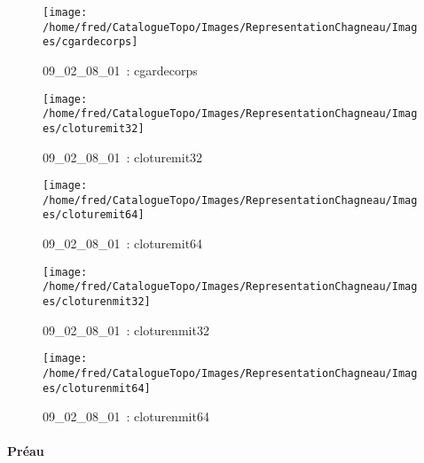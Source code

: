 \documentclass[12pt,titlepage]{book}
\begin{document}
\begin{figure}[h!]
  \begin{minipage}[t]{3cm}
    \begin{center}
      \texttt{[image: /home/fred/CatalogueTopo/Images/RepresentationChagneau/Images/cgardecorps]}
      \caption[~09\_02\_08\_01]{\small{09\_02\_08\_01~:} \tiny{cgardecorps}}\label{cgardecorps}
    \end{center}
  \end{minipage}
  \begin{minipage}[t]{3cm}
    \begin{center}
      \texttt{[image: /home/fred/CatalogueTopo/Images/RepresentationChagneau/Images/cloturemit32]}
      \caption[~09\_02\_08\_01]{\small{09\_02\_08\_01~:} \tiny{cloturemit32}}\label{cloturemit32}
    \end{center}
  \end{minipage}
  \begin{minipage}[t]{3cm}
    \begin{center}
      \texttt{[image: /home/fred/CatalogueTopo/Images/RepresentationChagneau/Images/cloturemit64]}
      \caption[~09\_02\_08\_01]{\small{09\_02\_08\_01~:} \tiny{cloturemit64}}\label{cloturemit64}
    \end{center}
  \end{minipage}
  \begin{minipage}[t]{3cm}
    \begin{center}
      \texttt{[image: /home/fred/CatalogueTopo/Images/RepresentationChagneau/Images/cloturenmit32]}
      \caption[~09\_02\_08\_01]{\small{09\_02\_08\_01~:} \tiny{cloturenmit32}}\label{cloturenmit32}
    \end{center}
  \end{minipage}
  \begin{minipage}[t]{3cm}
    \begin{center}
      \texttt{[image: /home/fred/CatalogueTopo/Images/RepresentationChagneau/Images/cloturenmit64]}
      \caption[~09\_02\_08\_01]{\small{09\_02\_08\_01~:} \tiny{cloturenmit64}}\label{cloturenmit64}
    \end{center}
  \end{minipage}
\end{figure}


\paragraph{Préau}
\noindent
\vspace{\baselineskip}
\end{document}
